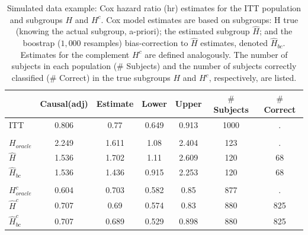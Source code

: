 \documentclass[smallextended]{svjour3}
\begin{document}
\begin{table}

\caption{\label{tab:simex_tab}\label{tab:simex} Simulated data example: Cox hazard ratio (hr) estimates for the ITT population and subgroups $H$ and $H^{c}$.
Cox model estimates are based on subgroups: H true (knowing the actual subgroup, a-priori); the estimated subgroup $\hat{H}$; and 
the boostrap ($1,000$ resamples) bias-correction to $\hat{H}$ estimates, denoted $\hat{H}_{bc}$.  Estimates for the complement $H^{c}$ are defined analogously.
The number of subjects in each population ($\#$ Subjects) and the number of subjects correctly classified ($\#$ Correct) in the true subgroups $H$ and $H^{c}$, respectively, are listed.}
\centering
\fontsize{9}{11}\selectfont
\begin{tabular}[t]{lcccccc}
\toprule
  & Causal(adj) & Estimate & Lower & Upper & $\#$ Subjects & $\#$ Correct\\
\midrule
ITT & 0.806 & 0.77 & 0.649 & 0.913 & 1000 & .\\
\addlinespace[0.3em]
\multicolumn{7}{l}{\textbf{H subgroup estimates}}\\
\hspace{1em}$H_{oracle}$ & 2.249 & 1.611 & 1.08 & 2.404 & 123 & .\\
\hspace{1em}$\hat{H}$ & 1.536 & 1.702 & 1.11 & 2.609 & 120 & 68\\
\hspace{1em}$\hat{H}_{bc}$ & 1.536 & 1.436 & 0.915 & 2.253 & 120 & 68\\
\addlinespace[0.3em]
\multicolumn{7}{l}{\textbf{H-complement subgroup estimates}}\\
\hspace{1em}$H^{c}_{oracle}$ & 0.604 & 0.703 & 0.582 & 0.85 & 877 & .\\
\hspace{1em}$\hat{H}^{c}$ & 0.707 & 0.69 & 0.574 & 0.83 & 880 & 825\\
\hspace{1em}$\hat{H}^{c}_{bc}$ & 0.707 & 0.689 & 0.529 & 0.898 & 880 & 825\\
\bottomrule
\end{tabular}
\end{table}





\end{document}
